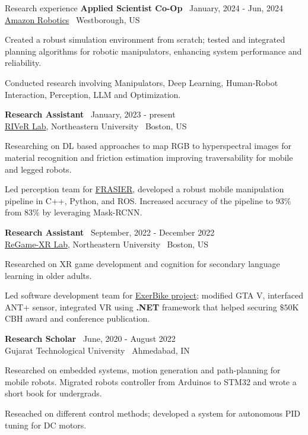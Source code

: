\documentclass{resume}
\begin{document}
\begin{rSection}{Research experience}
{\bf Applied Scientist Co-Op} \hfill {\ January, 2024 - Jun, 2024 }\\ 
{\href{https://www.aboutamazon.com/news/tag/robotics}{Amazon Robotics}} \hfill {\ {Westborough, US}}
\begin{cvitems}
    \item Created a robust simulation environment from scratch; tested and integrated planning algorithms for robotic manipulators, enhancing system performance and reliability.
    \item Conducted research involving Manipulators, Deep Learning, Human-Robot Interaction, Perception, LLM and Optimization.
\end{cvitems}
{\bf Research Assistant} \hfill {\ January, 2023 - present }\\ 
{\href{https://robot.neu.edu/}{RIVeR Lab}, Northeastern University} \hfill {\ {Boston, US}}
\begin{cvitems}
    \item Researching on DL based approaches to map RGB to hyperspectral images for material recognition and friction estimation improving traversability for mobile and legged robots.
    \item Led perception team for \href{https://robot.neu.edu/}{FRASIER}, developed a robust mobile manipulation pipeline in C++, Python, and ROS. Increased accuracy of the pipeline to $93\%$ from $83\%$ by leveraging Mask-RCNN.
\end{cvitems}
{\bf Research Assistant} \hfill {\ September, 2022 - December 2022 }\\ 
{\href{https://regamexr.sites.northeastern.edu/}{ReGame-XR Lab}, Northeastern University} \hfill {\ {Boston, US}}
\begin{cvitems}
    \item Researched on XR game development and cognition for secondary language learning in older adults.
    \item Led software development team for \href{https://games.northeastern.edu/project/exerbike/}{ExerBike project}; modified GTA V, interfaced ANT+ sensor, integrated VR using \textbf{.NET} framework that helped securing $\$50$K CBH award and conference publication.
\end{cvitems}
{\bf Research Scholar} \hfill {\ June, 2020 - August 2022 }\\ 
{Gujarat Technological University} \hfill {\ {Ahmedabad, IN}}
\begin{cvitems}
    \item Researched on embedded systems, motion generation and path-planning for mobile robots. Migrated robots controller from Arduinos to STM32 and wrote a short book for undergrads.
    \item Reseached on different control methods; developed a system for autonomous PID tuning for DC motors.
\end{cvitems}
\end{rSection}
\end{document}
